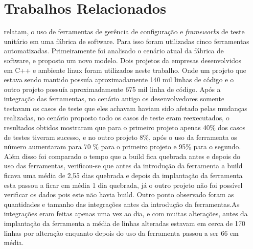 
\chapter{Trabalhos Relacionados}\label{trabalhorel}

 relatam, o uso de ferramentas de gerência de configuração e \textit{frameworks} de teste unitário em uma fábrica de software. Para isso foram utilizadas cinco ferramentas automatizadas. Primeiramente foi analisado o cenário atual da fábrica de software, e proposto um novo modelo. Dois projetos da empresas desenvolvidos em C++ e ambiente linux foram utilizados neste trabalho. Onde um projeto que estava sendo mantido possuía aproximadamente 140 mil linhas de código e o outro projeto possuía aproximadamente 675 mil linha de código. Após a integração das ferramentas, no cenário antigo os desenvolvedores somente testavam os casos de teste que eles achavam haviam sido afetado pelas mudanças realizadas, no cenário proposto todo os casos de teste eram reexecutados, o resultados obtidos mostraram que para o primeiro projeto apenas 40\% dos casos de testes tiveram sucesso, e no outro projeto 8\%, após o uso da ferramenta os número aumentaram para 70 \% para o primeiro projeto e 95\% para o segundo. Além disso foi comparado o tempo que a build fica quebrada antes e depois do uso das ferramentas, verificou-se que antes da introdução da ferramenta a build  ficava uma média de 2,55 dias quebrada e depois da implantação da ferramenta esta passou a ficar em média 1 dia quebrada, já o outro projeto não foi possível verificar os dados pois este não havia build. Outro ponto observado foram as quantidades e tamanho das integrações antes da introdução da ferramentas.As integrações eram feitas apenas uma vez ao dia, e com muitas alterações, antes da implantação da ferramenta a média de linhas alteradas estavam em cerca de 170 linhas por alteração enquanto depois do uso da ferramenta passou a ser 66 em média.